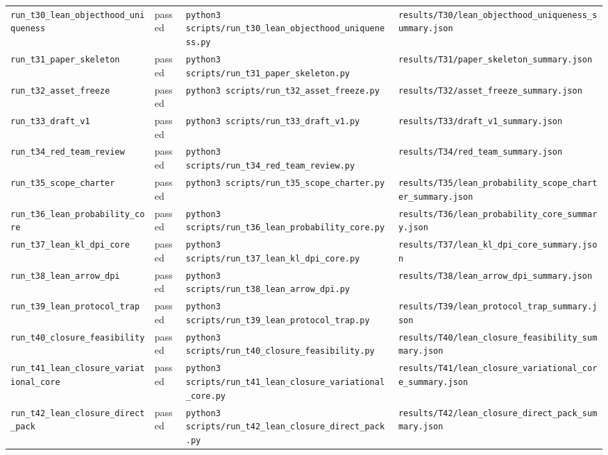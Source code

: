 {\begin{longtable}{>{\raggedright\arraybackslash}p{} >{\raggedright\arraybackslash}p{} >{\raggedright\arraybackslash}p{} >{\raggedright\arraybackslash}p{}}
\texttt{run\_t30\_lean\_objecthood\_uniqueness} & passed & \texttt{python3 scripts/run\_t30\_lean\_objecthood\_uniqueness.py} & \texttt{results/T30/lean\_objecthood\_uniqueness\_summary.json}\\
\texttt{run\_t31\_paper\_skeleton} & passed & \texttt{python3 scripts/run\_t31\_paper\_skeleton.py} & \texttt{results/T31/paper\_skeleton\_summary.json}\\
\texttt{run\_t32\_asset\_freeze} & passed & \texttt{python3 scripts/run\_t32\_asset\_freeze.py} & \texttt{results/T32/asset\_freeze\_summary.json}\\
\texttt{run\_t33\_draft\_v1} & passed & \texttt{python3 scripts/run\_t33\_draft\_v1.py} & \texttt{results/T33/draft\_v1\_summary.json}\\
\texttt{run\_t34\_red\_team\_review} & passed & \texttt{python3 scripts/run\_t34\_red\_team\_review.py} & \texttt{results/T34/red\_team\_summary.json}\\
\texttt{run\_t35\_scope\_charter} & passed & \texttt{python3 scripts/run\_t35\_scope\_charter.py} & \texttt{results/T35/lean\_probability\_scope\_charter\_summary.json}\\
\texttt{run\_t36\_lean\_probability\_core} & passed & \texttt{python3 scripts/run\_t36\_lean\_probability\_core.py} & \texttt{results/T36/lean\_probability\_core\_summary.json}\\
\texttt{run\_t37\_lean\_kl\_dpi\_core} & passed & \texttt{python3 scripts/run\_t37\_lean\_kl\_dpi\_core.py} & \texttt{results/T37/lean\_kl\_dpi\_core\_summary.json}\\
\texttt{run\_t38\_lean\_arrow\_dpi} & passed & \texttt{python3 scripts/run\_t38\_lean\_arrow\_dpi.py} & \texttt{results/T38/lean\_arrow\_dpi\_summary.json}\\
\texttt{run\_t39\_lean\_protocol\_trap} & passed & \texttt{python3 scripts/run\_t39\_lean\_protocol\_trap.py} & \texttt{results/T39/lean\_protocol\_trap\_summary.json}\\
\texttt{run\_t40\_closure\_feasibility} & passed & \texttt{python3 scripts/run\_t40\_closure\_feasibility.py} & \texttt{results/T40/lean\_closure\_feasibility\_summary.json}\\
\texttt{run\_t41\_lean\_closure\_variational\_core} & passed & \texttt{python3 scripts/run\_t41\_lean\_closure\_variational\_core.py} & \texttt{results/T41/lean\_closure\_variational\_core\_summary.json}\\
\texttt{run\_t42\_lean\_closure\_direct\_pack} & passed & \texttt{python3 scripts/run\_t42\_lean\_closure\_direct\_pack.py} & \texttt{results/T42/lean\_closure\_direct\_pack\_summary.json}\\

\end{longtable}}
